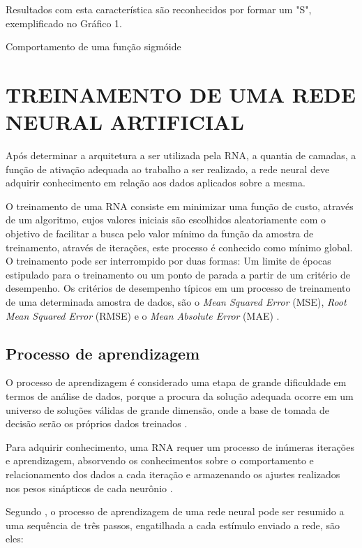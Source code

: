 Resultados com esta característica são reconhecidos por formar um "S", exemplificado no Gráfico 1.

\begin{grafico}[h]
	\centering
	\caption{Comportamento de uma função sigmóide}
	\label{sigmoide-graph}
\end{grafico}


\section{TREINAMENTO DE UMA REDE NEURAL ARTIFICIAL}\label{sec:rna-treinamento}
Após determinar a arquitetura a ser utilizada pela RNA, a quantia de camadas, a função de ativação adequada ao trabalho a ser realizado, a rede neural deve adquirir conhecimento em relação aos dados aplicados sobre a mesma.

O treinamento de uma RNA consiste em minimizar uma função de custo, através de um algoritmo, cujos valores iniciais são escolhidos aleatoriamente com o objetivo de facilitar a busca  pelo valor mínimo da função da amostra de treinamento, através de iterações, este processo é conhecido como mínimo global. O treinamento pode ser interrompido por duas formas: Um limite de épocas estipulado para o treinamento ou um ponto de parada a partir de um critério de desempenho. Os critérios de desempenho típicos em um processo de treinamento de uma determinada amostra de dados, são o \textit {Mean Squared Error} (MSE), \textit {Root Mean Squared Error} (RMSE) e o \textit {Mean Absolute Error} (MAE) \cite{gambogi}. 

\subsection{Processo de aprendizagem}
O processo de aprendizagem é considerado uma etapa de grande dificuldade em termos de análise de dados, porque a procura da solução adequada ocorre em um universo de soluções válidas de grande dimensão, onde a base de tomada de decisão serão os próprios dados treinados \cite{medeiros}.
 
Para adquirir conhecimento, uma RNA requer um processo de inúmeras iterações e aprendizagem, absorvendo os conhecimentos sobre o comportamento e relacionamento dos dados a cada iteração e armazenando os ajustes realizados nos pesos sinápticos de cada neurônio \cite{neto}.

Segundo , o processo de aprendizagem de uma rede neural pode ser resumido a uma sequência de três passos, engatilhada a cada estímulo enviado a rede, são eles:

